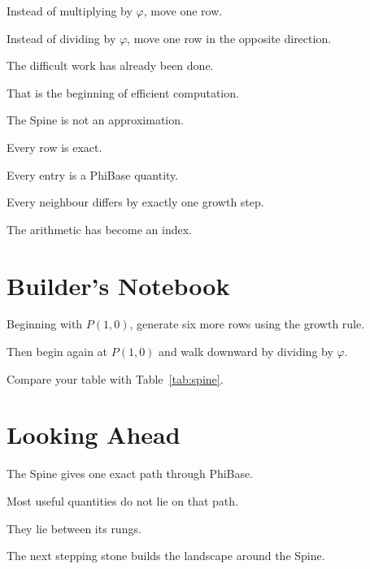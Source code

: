 Instead of multiplying by \(\varphi\), move one row.

Instead of dividing by \(\varphi\), move one row in the opposite direction.

The difficult work has already been done.

That is the beginning of efficient computation.

The Spine is not an approximation.

Every row is exact.

Every entry is a PhiBase quantity.

Every neighbour differs by exactly one growth step.

The arithmetic has become an index.

\section*{Builder's Notebook}

Beginning with \(P(1,0)\), generate six more rows using the growth rule.

Then begin again at \(P(1,0)\) and walk downward by dividing by \(\varphi\).

Compare your table with Table~\ref{tab:spine}.

\section*{Looking Ahead}

The Spine gives one exact path through PhiBase.

Most useful quantities do not lie on that path.

They lie between its rungs.

The next stepping stone builds the landscape around the Spine.
